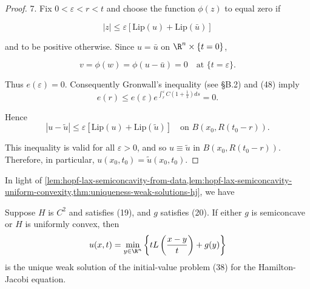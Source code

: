 \begin{proof}
7. Fix $0 < \varepsilon < r < t$ and choose the function $\phi(z)$ to equal zero if

$$|z| \leq \varepsilon[\text{Lip}(u) + \text{Lip}(\bar{u})]$$

and to be positive otherwise. Since $u = \bar{u}$ on $\R^n \times \{t = 0\}$,

$$v = \phi(w) = \phi(u - \bar{u}) = 0 \quad \text{at } \{t = \varepsilon\}.$$

Thus $e(\varepsilon) = 0$. Consequently Gronwall's inequality (see \S B.2) and (48) imply
$$e(r) \leq e(\varepsilon) e^{\int_r^\varepsilon C(1 + \frac{1}{s})ds} = 0.$$

Hence
$$|u - \tilde{u}| \leq \varepsilon[\text{Lip}(u) + \text{Lip}(\tilde{u})] \quad \text{on } B(x_0, R(t_0 - r)).$$

This inequality is valid for all $\varepsilon > 0$, and so $u \equiv \tilde{u}$ in $B(x_0, R(t_0 - r))$. Therefore, in particular, $u(x_0, t_0) = \tilde{u}(x_0, t_0)$.
\end{proof}

In light of \cref{lem:hopf-lax-semiconcavity-from-data,lem:hopf-lax-semiconcavity-uniform-convexity,thm:uniqueness-weak-solutions-hj}, we have

\begin{theorem}
\label{thm:hopf-lax-formula-weak-solution}
Suppose $H$ is $C^2$ and satisfies (19), and $g$ satisfies (20). If either $g$ is semiconcave or $H$ is uniformly convex, then
$$u(x,t) = \min_{y \in \R^n} \left\{ tL\left(\frac{x - y}{t}\right) + g(y) \right\}$$
is the unique weak solution of the initial-value problem (38) for the Hamilton-Jacobi equation.
\end{theorem}

